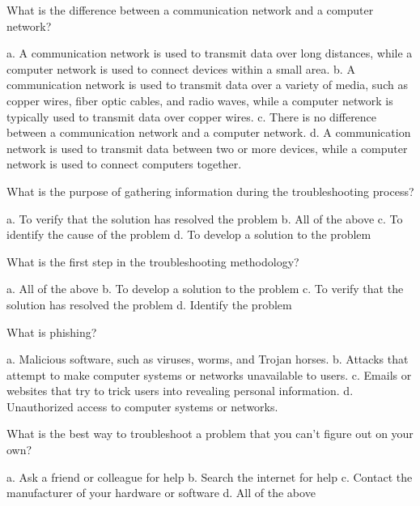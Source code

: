 \documentclass{exam}
\begin{document}
\begin{questions}
\question What is the difference between a communication network and a computer network?
\begin{checkboxes}
\choice a. A communication network is used to transmit data over long distances, while a computer network is used to connect devices within a small area.
\choice b. A communication network is used to transmit data over a variety of media, such as copper wires, fiber optic cables, and radio waves, while a computer network is typically used to transmit data over copper wires.
\choice c. There is no difference between a communication network and a computer network.
\CorrectChoice d. A communication network is used to transmit data between two or more devices, while a computer network is used to connect computers together.
\end{checkboxes}

\question What is the purpose of gathering information during the troubleshooting process?
\begin{checkboxes}
\choice a. To verify that the solution has resolved the problem
\CorrectChoice b. All of the above
\choice c. To identify the cause of the problem
\choice d. To develop a solution to the problem
\end{checkboxes}

\question What is the first step in the troubleshooting methodology?
\begin{checkboxes}
\choice a. All of the above
\choice b. To develop a solution to the problem
\choice c. To verify that the solution has resolved the problem
\CorrectChoice d. Identify the problem
\end{checkboxes}

\question What is phishing?
\begin{checkboxes}
\choice a. Malicious software, such as viruses, worms, and Trojan horses.
\choice b. Attacks that attempt to make computer systems or networks unavailable to users.
\CorrectChoice c. Emails or websites that try to trick users into revealing personal information.
\choice d. Unauthorized access to computer systems or networks.
\end{checkboxes}

\question What is the best way to troubleshoot a problem that you can't figure out on your own?
\begin{checkboxes}
\choice a. Ask a friend or colleague for help
\choice b. Search the internet for help
\choice c. Contact the manufacturer of your hardware or software
\CorrectChoice d. All of the above
\end{checkboxes}


\end{questions}
\end{document}
